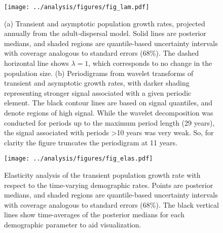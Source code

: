 \documentclass[11pt]{article}
\begin{document}
\clearpage
\begin{figure}
\centering
\texttt{[image: ../analysis/figures/fig\_lam.pdf]}
\caption{\label{fig:lam}
(a) Transient and asymptotic population growth rates,
projected annually from the adult-dispersal model.
Solid lines are posterior medians,
and shaded regions are quantile-based uncertainty intervals
with coverage analogous to standard errors (68\%).
The dashed horizontal line shows $\lambda=1$, 
which corresponds to no change in the population size.
(b) Periodigrams from wavelet transforms of transient and asymptotic growth rates,
with darker shading representing stronger signal associated with a given periodic element.
The black contour lines are based on signal quantiles, and denote regions of high signal.
While the wavelet decomposition was conducted for periods up to the maximum period length
(29 years), the signal associated with periods >10 years was very weak. 
So, for clarity the figure truncates the periodigram at 11 years.
}
\end{figure}
\clearpage

\clearpage
\begin{figure}
\centering
\texttt{[image: ../analysis/figures/fig\_elas.pdf]}
\caption{\label{fig:elas}
Elasticity analysis of the transient population growth rate 
with respect to the time-varying demographic rates.
Points are posterior medians,
and shaded regions are quantile-based uncertainty intervals
with coverage analogous to standard errors (68\%).
The black vertical lines show time-averages of the posterior medians 
for each demographic parameter to aid visualization.
}
\end{figure}
\clearpage





\renewcommand{\thefigure}{A\arabic{figure}}
\renewcommand{\theequation}{A\arabic{equation}}
\renewcommand{\thetable}{A\arabic{table}}
\setcounter{equation}{0}
\setcounter{figure}{0}
\setcounter{table}{0}
\end{document}
